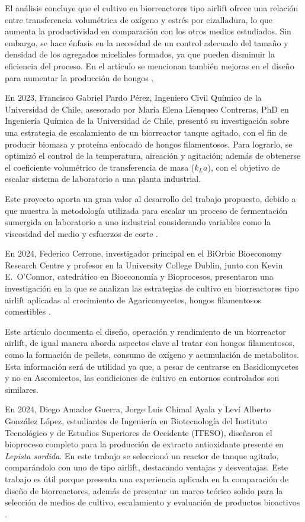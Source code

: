 El análisis concluye que el cultivo en biorreactores tipo airlift ofrece una relación
entre transferencia volumétrica de oxígeno y estrés por cizalladura, lo que aumenta
la productividad en comparación con los otros medios estudiados. Sin embargo, se
hace énfasis en la necesidad de un control adecuado del tamaño y densidad de los
agregados miceliales formados, ya que pueden disminuir la eficiencia del proceso.
En el artículo se mencionan también mejoras en el diseño para aumentar la
producción de hongos \cite{Cerrone2025}.

En 2023, Francisco Gabriel Pardo Pérez, Ingeniero Civil Químico de la Universidad
de Chile, asesorado por María Elena Lienqueo Contreras, PhD en Ingeniería
Química de la Universidad de Chile, presentó su investigación sobre una estrategia
de escalamiento de un biorreactor tanque agitado, con el fin de producir biomasa y
proteína enfocado de hongos filamentosos. Para lograrlo, se optimizó el control de
la temperatura, aireación y agitación; además de obtenerse el coeficiente
volumétrico de transferencia de masa ($k_L a$), con el objetivo de escalar sistema de
laboratorio a una planta industrial.

Este proyecto aporta un gran valor al desarrollo del trabajo propuesto, debido a que
muestra la metodología utilizada para escalar un proceso de fermentación
sumergida en laboratorio a uno industrial considerando variables como la
viscosidad del medio y esfuerzos de corte \cite{Pardo2023}.

En 2024, Federico Cerrone, investigador principal en el BiOrbic Bioeconomy
Research Centre y profesor en la University College Dublin, junto con Kevin E.\
O'Connor, catedrático en Bioeconomía y Bioprocesos, presentaron una
investigación en la que se analizan las estrategias de cultivo en biorreactores tipo
airlift aplicadas al crecimiento de Agaricomycetes, hongos filamentosos comestibles \cite{Cerrone2024}.

Este artículo documenta el diseño, operación y rendimiento de un biorreactor airlift,
de igual manera aborda aspectos clave al tratar con hongos filamentosos, como la
formación de pellets, consumo de oxígeno y acumulación de metabolitos. Esta
información será de utilidad ya que, a pesar de centrarse en Basidiomycetes y no
en Ascomicetos, las condiciones de cultivo en entornos controlados son similares.

En 2024, Diego Amador Guerra, Jorge Luis Chimal Ayala y Leví Alberto González
López, estudiantes de Ingeniería en Biotecnología del Instituto Tecnológico y de
Estudios Superiores de Occidente (ITESO), diseñaron el bioproceso completo para
la producción de extracto antioxidante presente en \textit{Lepista sordida}. En este trabajo
se seleccionó un reactor de tanque agitado, comparándolo con uno de tipo airlift,
destacando ventajas y desventajas. Este trabajo es útil porque presenta una
experiencia aplicada en la comparación de diseño de biorreactores, además de
presentar un marco teórico solido para la selección de medios de cultivo,
escalamiento y evaluación de productos bioactivos \cite{Amador2024}.
